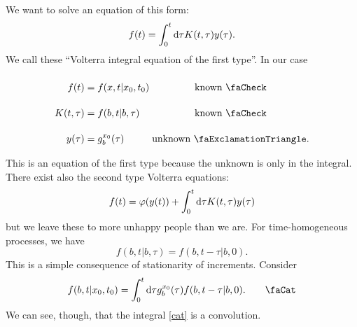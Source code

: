 \documentclass[12pt]{report}
\begin{document}
We want to solve an equation of this form:
\begin{equation*}
	f(t)=\int_{0}^{t}\mathop{}\!\mathrm{d}\tau K(t,\tau)y(\tau).
\end{equation*}
We call these ``Volterra integral equation of the first type''. In our case
\begin{equation*}
	\arraycolsep=1.4pt\def\arraystretch{2.2}
	\begin{array}{rlc}
		f(t)&=f(x,t|x_{0},t_{0})&\text{known \faCheck}\\
		K(t,\tau)&=f(b,t|b,\tau)&\text{known \faCheck}\\
		y(\tau)&=g_{{b}}^{x_{0}}(\tau)&\text{unknown \faExclamationTriangle}.
	\end{array}
\end{equation*}
This is an equation of the first type because the unknown is only in the integral. There exist also the second type Volterra equations:
\begin{equation*}
	f(t)=\varphi(y(t))+\int_{0}^{t}\mathop{}\!\mathrm{d}\tau K(t,\tau)y(\tau)
\end{equation*}
but we leave these to more unhappy people than we are.
For time-homogeneous processes, we have
\begin{equation*}
	f(b,t|b,\tau)=f(b,t-\tau|b,0).
\end{equation*}
This is a simple consequence of stationarity of increments. Consider
\begin{equation*}
	f(b,t|x_{0},t_{0})=\int_{0}^{t}\dif\tau g_{b}^{x_{0}}(\tau)f(b,t-\tau|b,0).\tag*{\faCat}\label{cat}
\end{equation*} We can see, though, that the integral \ref{cat} is a convolution.
\end{document}
